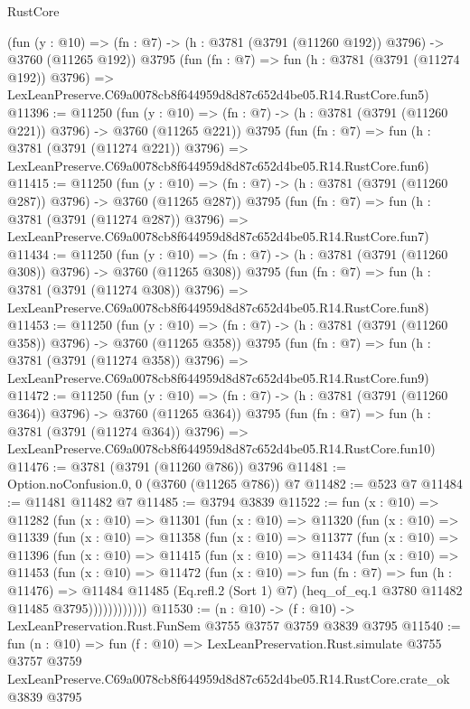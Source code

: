 \begin{lexlean}{RustCore}
\begin{coremodule}
    (fun (y : @10) => (fn : @7) -> (h : @3781 (@3791 (@11260 @192)) @3796) -> @3760 (@11265 @192))
    @3795
    (fun (fn : @7) =>
    fun (h : @3781 (@3791 (@11274 @192)) @3796) =>
    LexLeanPreserve.C69a0078cb8f644959d8d87c652d4be05.R14.RustCore.fun5)
@11396 := @11250
    (fun (y : @10) => (fn : @7) -> (h : @3781 (@3791 (@11260 @221)) @3796) -> @3760 (@11265 @221))
    @3795
    (fun (fn : @7) =>
    fun (h : @3781 (@3791 (@11274 @221)) @3796) =>
    LexLeanPreserve.C69a0078cb8f644959d8d87c652d4be05.R14.RustCore.fun6)
@11415 := @11250
    (fun (y : @10) => (fn : @7) -> (h : @3781 (@3791 (@11260 @287)) @3796) -> @3760 (@11265 @287))
    @3795
    (fun (fn : @7) =>
    fun (h : @3781 (@3791 (@11274 @287)) @3796) =>
    LexLeanPreserve.C69a0078cb8f644959d8d87c652d4be05.R14.RustCore.fun7)
@11434 := @11250
    (fun (y : @10) => (fn : @7) -> (h : @3781 (@3791 (@11260 @308)) @3796) -> @3760 (@11265 @308))
    @3795
    (fun (fn : @7) =>
    fun (h : @3781 (@3791 (@11274 @308)) @3796) =>
    LexLeanPreserve.C69a0078cb8f644959d8d87c652d4be05.R14.RustCore.fun8)
@11453 := @11250
    (fun (y : @10) => (fn : @7) -> (h : @3781 (@3791 (@11260 @358)) @3796) -> @3760 (@11265 @358))
    @3795
    (fun (fn : @7) =>
    fun (h : @3781 (@3791 (@11274 @358)) @3796) =>
    LexLeanPreserve.C69a0078cb8f644959d8d87c652d4be05.R14.RustCore.fun9)
@11472 := @11250
    (fun (y : @10) => (fn : @7) -> (h : @3781 (@3791 (@11260 @364)) @3796) -> @3760 (@11265 @364))
    @3795
    (fun (fn : @7) =>
    fun (h : @3781 (@3791 (@11274 @364)) @3796) =>
    LexLeanPreserve.C69a0078cb8f644959d8d87c652d4be05.R14.RustCore.fun10)
@11476 := @3781 (@3791 (@11260 @786)) @3796
@11481 := Option.noConfusion.{0, 0} (@3760 (@11265 @786)) @7
@11482 := @523 @7
@11484 := @11481 @11482 @7
@11485 := @3794 @3839
@11522 := fun (x : @10) =>
  @11282
    (fun (x : @10) =>
    @11301
      (fun (x : @10) =>
      @11320
        (fun (x : @10) =>
        @11339
          (fun (x : @10) =>
          @11358
            (fun (x : @10) =>
            @11377
              (fun (x : @10) =>
              @11396
                (fun (x : @10) =>
                @11415
                  (fun (x : @10) =>
                  @11434
                    (fun (x : @10) =>
                    @11453
                      (fun (x : @10) =>
                      @11472
                        (fun (x : @10) =>
                        fun (fn : @7) =>
                        fun (h : @11476) =>
                        @11484
                          @11485
                          (Eq.refl.{2} (Sort 1) @7)
                          (heq_of_eq.{1} @3780 @11482 @11485 @3795))))))))))))
@11530 := (n : @10) -> (f : @10) -> LexLeanPreservation.Rust.FunSem @3755 @3757 @3759 @3839 @3795
@11540 := fun (n : @10) =>
  fun (f : @10) =>
  LexLeanPreservation.Rust.simulate
    @3755
    @3757
    @3759
    LexLeanPreserve.C69a0078cb8f644959d8d87c652d4be05.R14.RustCore.crate_ok
    @3839
    @3795
\end{coremodule}
\end{lexlean}
